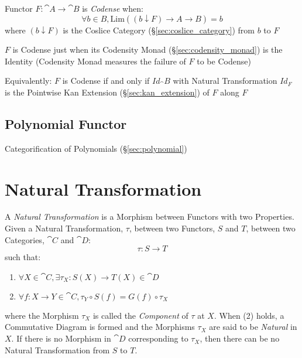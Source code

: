 Functor $F : \cat{A} \rightarrow \cat{B}$ is \emph{Codense} when:
\[
  \forall b \in B,
  \mathrm{Lim}((b \downarrow F) \rightarrow A \rightarrow B) = b
\]
where $(b \downarrow F)$ is the Coslice Category
(\S\ref{sec:coslice_category}) from $b$ to $F$

$F$ is Codense just when its Codensity Monad
(\S\ref{sec:codensity_monad}) is the Identity (Codensity Monad
measures the failure of $F$ to be Codense)

Equivalently: $F$ is Codense if and only if $Id_\cat{B}$ with Natural
Transformation $Id_F$ is the Pointwise Kan Extension
(\S\ref{sec:kan_extension}) of $F$ along $F$



\subsection{Polynomial Functor} \label{sec:polynomial_functor}

Categorification of Polynomials (\S\ref{sec:polynomial})



\section{Natural Transformation}\label{sec:natural_transformation}

A \emph{Natural Transformation} is a Morphism between Functors with
two Properties. Given a Natural Transformation, $\tau$, between two
Functors, $S$ and $T$, between two Categories, $\cat{C}$ and
$\cat{D}$:
\[
  \tau : S \rightarrow T
\]
such that:
\begin{enumerate}
  \item $\forall X \in \cat{C},
    \exists \tau_X : S(X) \rightarrow T(X) \in \cat{D}$
  \item $\forall f : X \rightarrow Y \in \cat{C},
    \tau_Y \circ S(f) = G(f) \circ \tau_X$
\end{enumerate}
where the Morphism $\tau_X$ is called the \emph{Component} of $\tau$
at $X$. When (2) holds, a Commutative Diagram is formed and the
Morphisms $\tau_X$ are said to be \emph{Natural} in $X$. If there is
no Morphism in $\cat{D}$ corresponding to $\tau_X$, then there can
be no Natural Transformation from $S$ to $T$.

